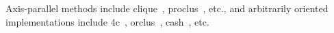 \begin{itemize}
    
    Axis-parallel methods include \acrshort{clique}~\cite{cliqueagrawal1998automatic}, \acrshort{proclus}~\cite{proclusaggarwal1999fast}, etc., and arbitrarily oriented implementations include \acrshort{4c}~\cite{4cbohm2004computing}, \acrshort{orclus}~\cite{orclusaggarwal2000finding}, \acrshort{cash}~\cite{CASHachtert2008global}, etc.
\end{itemize}

